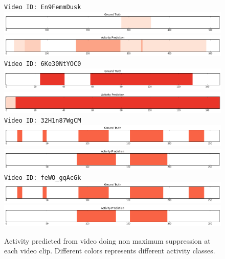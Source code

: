 \begin{figure}[H]
\begin{center}
\texttt{Video ID: En9FemmDusk}
\includegraphics[width=1\linewidth]{img/results/results_visualization_detection_classes_a_1}
\includegraphics[width=1\linewidth]{img/results/results_visualization_detection_classes_a_2}
\texttt{Video ID: 6Ke30NtYOC0}
\includegraphics[width=1\linewidth]{img/results/results_visualization_detection_classes_b_1}
\includegraphics[width=1\linewidth]{img/results/results_visualization_detection_classes_b_2}
\texttt{Video ID: 32H1n87WgCM}
\includegraphics[width=1\linewidth]{img/results/results_visualization_detection_classes_c_1}
\includegraphics[width=1\linewidth]{img/results/results_visualization_detection_classes_c_2}
\texttt{Video ID: feWO\_gqAcGk}
\includegraphics[width=1\linewidth]{img/results/results_visualization_detection_classes_c_1}
\includegraphics[width=1\linewidth]{img/results/results_visualization_detection_classes_c_2}
\end{center}
\caption{Activity predicted from video doing non maximum suppression at each video clip. Different colors represents different activity classes.}
\label{fig:results_visualization_detection_classes}
\end{figure}


